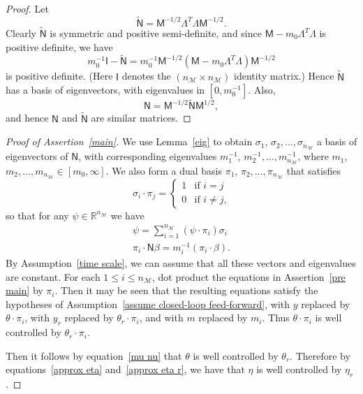 \documentclass[oneside,twocolumn,reqno]{amsart}
\begin{document}
\begin{proof}  Let
\begin{equation}
\tilde{\mathsf N} = \mathsf M^{-1/2} \mathsf \Lambda^T \mathsf \Lambda \mathsf M^{-1/2} .
\end{equation}
Clearly $\tilde{\mathsf N}$ is symmetric and positive semi-definite, and since $\mathsf M - m_0 \mathsf \Lambda^T \mathsf \Lambda$ is positive definite, we have
\begin{equation}
m_0^{-1} \mathsf I - \tilde{\mathsf N} = m_0^{-1} \mathsf M^{-1/2} (\mathsf M - m_0 \mathsf \Lambda^T \Lambda) \mathsf M^{-1/2}
\end{equation}
is positive definite.  (Here $\mathsf I$ denotes the $(n_{\mathcal M}\times n_{\mathcal M})$ identity matrix.)  Hence $\tilde{\mathsf N}$ has a basis of eigenvectors, with eigenvalues in $[0,m_0^{-1}]$.  Also,
\begin{equation}
\mathsf N = \mathsf M^{-1/2} \tilde{\mathsf N} \mathsf M^{1/2} ,
\end{equation}
and hence $\mathsf N$ and $\tilde{\mathsf N}$ are similar matrices.
\end{proof}

\smallskip

\begin{proof}[Proof of Assertion~\ref{main}]  We use Lemma~\ref{eig} to obtain 
$\sigma_1$, $\sigma_2,\dots,\sigma_{n_{\mathcal M}}$ a basis of eigenvectors of $\mathsf N$, with corresponding eigenvalues
$m_1^{-1}$, $m_2^{-1}, \dots, m_{n_{\mathcal M}}^{-1}$, where $m_1$, $m_2, \dots, m_{n_{\mathcal M}} \in [m_0,\infty]$.  We also form a dual basis $\pi_1$, $\pi_2,\dots,\pi_{n_{\mathcal M}}$ that satisfies
\begin{equation}
\sigma_i \cdot \pi_j = \begin{cases} 1 & \text{if $i=j$} \\ 0 & \text{if $i \ne j$,}\end{cases}
\end{equation}
so that for any $\psi \in \mathbb R^{n_{\mathcal M}}$ we have
\begin{gather}
\label{mu nu}
\psi = \sum_{i=1}^{n_{\mathcal M}} (\psi \cdot \pi_i) \sigma_i \\
\pi_i \cdot \mathsf N \beta = m_i^{-1} (\pi_i \cdot \beta) .
\end{gather}
By Assumption~\ref{time scale}, we can assume that all these vectors and eigenvalues are constant.  For each $1 \le i \le n_{\mathcal M}$, dot product the equations in Assertion~\ref{pre main} by $\pi_i$.  Then it may be seen that the resulting equations satisfy the hypotheses of Assumption~\ref{assume closed-loop feed-forward}, with $y$ replaced by $\theta \cdot \pi_i$, with $y_r$ replaced by $\theta_r \cdot \pi_i$, and with $m$ replaced by $m_i$.  Thus $\theta \cdot \pi_i$ is well controlled by $\theta_r \cdot \pi_i$.

Then it follows by equation~\eqref{mu nu} that $\theta$ is well controlled by $\theta_r$.  Therefore by equations~\eqref{approx eta} and~\eqref{approx eta r}, we have that $\eta$ is well controlled by $\eta_r$.
\end{proof}
\end{document}
